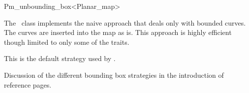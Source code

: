 
\ccRefPageBegin


\begin{ccRefClass}{Pm_unbounding_box<Planar_map>}
\label{Pm_ref:unbounding_box}

\ccDefinition 
    The \ccRefName\ class
    implements the naive approach that deals only with bounded curves.
    The curves are inserted into the map as is. 
    This approach is highly efficient though limited to only some of the 
    traits.

    This is the default strategy used by .

\ccThreeToTwo


\ccIsModel

\ccInheritsFrom


  
\ccSeeAlso
   Discussion of the different bounding box strategies in the introduction
of  reference pages.

\end{ccRefClass} %

\ccRefPageEnd


